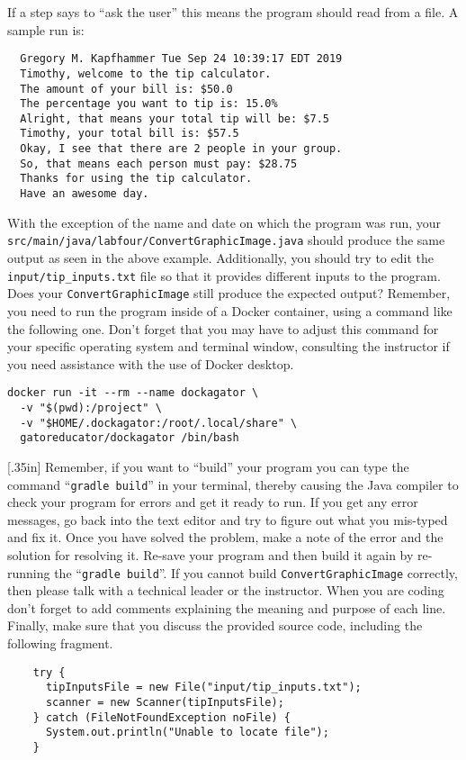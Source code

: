 \documentclass[11pt]{article}
\newcommand{\mainprogram}{\lstinline{ConvertGraphicImage}}
\newcommand{\mainprogramsource}{\lstinline{src/main/java/labfour/ConvertGraphicImage.java}}
\newcommand{\mainprograminput}{\lstinline{input/tip_inputs.txt}}
\newcommand{\gradlebuild}{\command{gradle build}}
\newcommand{\command}[1]{``\lstinline{#1}''}
\newcommand{\step}[1]{``{#1}''}
\newcommand{\discuss}[1]{\null\hfill\LARGE{\faCommentO{}}\newline\scriptsize{\em{#1}}}
\begin{document}
\noindent If a step says to ``ask the user'' this means the program should read
from a file. A sample run is:

\begin{verbatim}
  Gregory M. Kapfhammer Tue Sep 24 10:39:17 EDT 2019
  Timothy, welcome to the tip calculator.
  The amount of your bill is: $50.0
  The percentage you want to tip is: 15.0%
  Alright, that means your total tip will be: $7.5
  Timothy, your total bill is: $57.5
  Okay, I see that there are 2 people in your group.
  So, that means each person must pay: $28.75
  Thanks for using the tip calculator.
  Have an awesome day.
\end{verbatim}

With the exception of the name and date on which the program was run, your
\mainprogramsource{} should produce the same output as seen in the above
example. Additionally, you should try to edit the \mainprograminput{} file so
that it provides different inputs to the program. Does your \mainprogram{} still
produce the expected output? Remember, you need to run the program inside of a
Docker container, using a command like the following one. Don't forget that you
may have to adjust this command for your specific operating system and terminal
window, consulting the instructor if you need assistance with the use of Docker
desktop.

\begin{verbatim}
docker run -it --rm --name dockagator \
  -v "$(pwd):/project" \
  -v "$HOME/.dockagator:/root/.local/share" \
  gatoreducator/dockagator /bin/bash
\end{verbatim}

\marginnote{\discuss{Discuss input code}}[.35in] Remember, if you want to
\step{build} your program you can type the command \gradlebuild{} in your
terminal, thereby causing the Java compiler to check your program for errors and
get it ready to run. If you get any error messages, go back into the text editor
and try to figure out what you mis-typed and fix it. Once you have solved the
problem, make a note of the error and the solution for resolving it. Re-save
your program and then build it again by re-running the \gradlebuild{}. If you
cannot build \mainprogram{} correctly, then please talk with a technical leader
or the instructor. When you are coding don't forget to add comments explaining
the meaning and purpose of each line. Finally, make sure that you discuss the
provided source code, including the following fragment.

\begin{verbatim}
    try {
      tipInputsFile = new File("input/tip_inputs.txt");
      scanner = new Scanner(tipInputsFile);
    } catch (FileNotFoundException noFile) {
      System.out.println("Unable to locate file");
    }
\end{verbatim}
\end{document}
